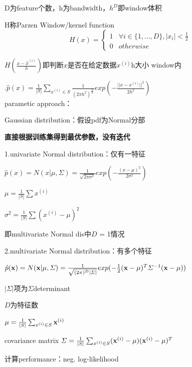 \documentclass[UTF8]{ctexart}
\begin{document}
  \quad \quad \quad D为feature个数，h为bandwidth，$h^D$即window体积

  \quad \quad \quad H称Parzen Window/kernel function\begin{equation*}
    H(x) = \begin{cases}
    1 &\forall i \in \{1, ..., D\}, |x_i| < \frac{1}{2}\\
    0 & otherwise
    \end{cases}
  \end{equation*}
  
  \quad \quad \quad $H(\frac{x - \hat{x}^{(i)}}{h})$即判断$x$是否在给定数据$x^{(i)}$h大小 window内

  \quad {}.$\hat{p}(x) = \frac{1}{|S|}\sum_{x^{(i)} \in S}\frac{1}{(2 \pi h^2)^{\frac{D}{2}}}exp(-\frac{||x - x^{(i)}||^2}{2h^2})$\\

  parametic approach：

  \quad Gaussian distribution：假设pdf为Normal分部

  \quad \quad \textbf{直接根据训练集得到最优参数，没有迭代}

  \quad \quad 1.univariate Normal distribution：仅有一特征
  
  \quad \quad \quad $\hat{p}(x) = N(x|\mu, \varSigma) = \frac{1}{\sqrt{2\pi \sigma^2}}exp(-\frac{(x - \mu)^2}{2\sigma^2})$

  \quad \quad \quad \quad $\mu = \frac{1}{|S|}\sum x^{(i)}$

  \quad \quad \quad \quad $\sigma^2 = \frac{1}{|S|}\sum(x^{(i)} - \mu)^2$

  \quad \quad \quad \quad 即multivariate Normal dis中$D$ = 1情况

  \quad \quad 2.multivariate Normal distribution：有多个特征
  
  \quad \quad \quad $\hat{p}({\bf x}) = N({\bf x}|\mu, \varSigma) = \frac{1}{\sqrt{(2\pi)^D|\varSigma|}}exp(-\frac{1}{2}({\bf x}-\mu)^T\varSigma^{-1}({\bf x}-\mu))$

  \quad \quad \quad \quad $|\varSigma|$项为$\varSigma$determinant

  \quad \quad \quad \quad $D$为特征数

  \quad \quad \quad \quad $\mu = \frac{1}{|S|}\sum_{x^{(i)} \in S}{\bf x}^{(i)}$

  \quad \quad \quad \quad covariance matrix $\varSigma = \frac{1}{|S|}\sum_{x^{(i)} \in S}({\bf x}^{(i)} - \mu)({\bf x}^{(i)} - \mu)^T$

  \quad \quad 计算performance：neg. log-likelihood
\end{document}
